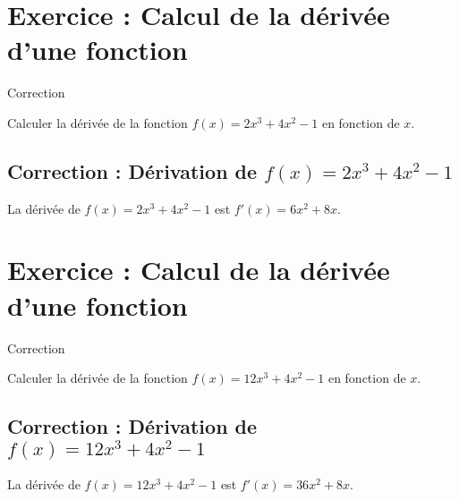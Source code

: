 \documentclass[a4paper, 12pt]{article}
\newenvironment{Exercice}[1][]{
    \section*{Exercice : #1}
}{}
\newenvironment{Correction}[1][]{
        \subsection*{\color{blue}Correction : #1}
        \color{blue} %
    }{}
\newenvironment{Correction}[1][]{\comment}{\endcomment}
\begin{document}
\begin{Exercice}[Calcul de la dérivée d'une fonction]
\begin{center} Correction\\\vspace*{2mm}
\end{center}
    Calculer la dérivée de la fonction $f(x) = 2x^3 + 4x^2 - 1$ en fonction de $x$.
    \begin{Correction}[Dérivation de $f(x) = 2x^3 + 4x^2 - 1$]
        La dérivée de $f(x) = 2x^3 + 4x^2 - 1$ est $f'(x) = 6x^2 + 8x$.
    \end{Correction}
\end{Exercice}


\begin{Exercice}[Calcul de la dérivée d'une fonction]
\begin{center} Correction\\\vspace*{2mm}
\end{center}
    Calculer la dérivée de la fonction $f(x) = 12x^3 + 4x^2 - 1$ en fonction de $x$.
    \begin{Correction}[Dérivation de $f(x) = 12x^3 + 4x^2 - 1$]

        La dérivée de $f(x) = 12x^3 + 4x^2 - 1$ est $f'(x) = 36x^2 + 8x$.
    \end{Correction}
\end{Exercice}
\end{document}

